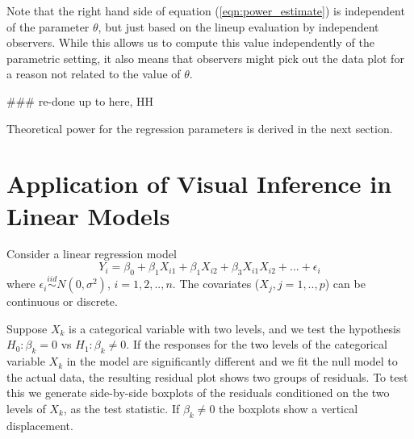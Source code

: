 \documentclass{article}
\newcommand{\blue}[1]{{\color{blue} #1}} %
\newcommand{\red}[1]{{\color{red} #1}} %
\newtheorem{dfn}{Definition}[section]
\begin{document}
\blue{Note that the right hand side of equation (\ref{eqn:power_estimate}) is independent of the parameter $\theta$, but just based on the lineup evaluation by independent observers. While this allows us to compute this value independently of the parametric setting, it also means that observers might pick out the data plot for a reason not related to the value of $\theta$. 


%
%
%
}

\red{\#\#\# re-done up to here, HH}



Theoretical power for the regression parameters is derived in the next section.

\section{Application of Visual Inference in Linear Models} \label{sec:regression}

Consider a linear regression model 
\begin{equation}\label{multi} Y_i = \beta_0 + \beta_1 X_{i1} + \beta_1 X_{i2} + \beta_3 X_{i1}X_{i2} + ... + \epsilon_i 
\end{equation}
where $\epsilon_i \stackrel{iid}{ \sim } N(0,\sigma^2)$, $i=1,2, .., n$. The covariates ($X_j, j=1,..,p$) can be continuous or discrete. 

Suppose $X_k$ is a categorical variable with two levels, and we test the hypothesis $H_0:\beta_k=0$ vs $H_1: \beta_k \ne 0$. If the responses for the two levels of the categorical variable $X_k$ in the model are significantly different and we fit the null model to the actual data, the resulting residual plot shows two groups of residuals. To test this we generate side-by-side boxplots of the residuals conditioned on the two levels of $X_k$, as the test statistic. If $\beta_k\ne 0$ the boxplots show a vertical displacement. 
\end{document}

